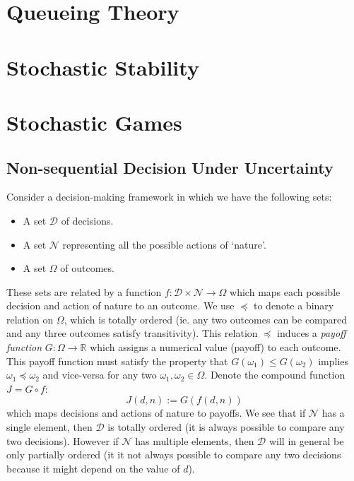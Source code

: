 \documentclass[11pt]{report} %
\begin{document}
\section{Queueing Theory \cite{Leon-Garcia2008}}

\section{Stochastic Stability}

\section{Stochastic Games}

\subsection{Non-sequential Decision Under Uncertainty \cite{Bertsekas1976}}

Consider a decision-making framework in which we have the following sets:
\begin{itemize}
\item A set $\mathcal{D}$ of decisions.
\item A set $\mathcal{N}$ representing all the possible actions of `nature'.
\item A set $\Omega$ of outcomes.
\end{itemize}
These sets are related by a function $f: \mathcal{D} \times \mathcal{N} \to \Omega$ which maps each possible decision and action of nature to an outcome. We use $\preceq$ to denote a binary relation on $\Omega$, which is totally ordered (ie. any two outcomes can be compared and any three outcomes satisfy transitivity). This relation $\preceq$ induces a \textit{payoff function} $G: \Omega \to \mathbb{R}$ which assigns a numerical value (payoff) to each outcome. This payoff function must satisfy the property that $G\left(\omega_{1}\right) \leq G\left(\omega_{2}\right)$ implies $\omega_{1} \preceq \omega_{2}$ and vice-versa for any two $\omega_{1}, \omega_{2} \in \Omega$. Denote the compound function $J = G \circ f$:
\begin{equation}
J\left(d, n\right) := G\left(f\left(d, n\right)\right)
\end{equation}
which maps decisions and actions of nature to payoffs. We see that if $\mathcal{N}$ has a single element, then $\mathcal{D}$ is totally ordered (it is always possible to compare any two decisions). However if $\mathcal{N}$ has multiple elements, then $\mathcal{D}$ will in general be only partially ordered (it it not always possible to compare any two decisions because it might depend on the value of $d$).
\end{document}

